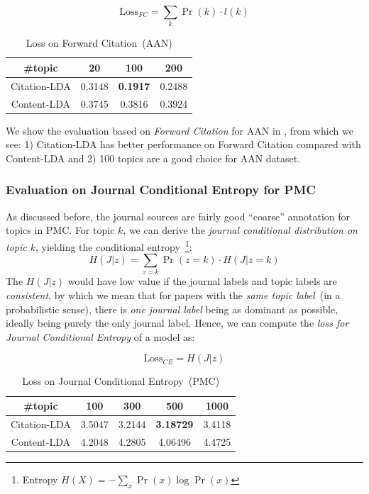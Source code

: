  $$\mathrm{Loss}_{FC} = \sum\limits_k \Pr(k) \cdot l(k)$$

\begin{table}[h!]
\caption{Loss on Forward Citation~(AAN)}
\label{tab::citation-fc}
\begin{center}
\begin{tabular}{|c|c|c|c|}
\hline
\#topic	&	20	&	100	&	200 \\
\hline\hline
Citation-LDA 	& 0.3148		&	\textbf{0.1917}	&	0.2488	\\
Content-LDA		& 0.3745		&	0.3816	&	0.3924	\\
\hline \hline
\end{tabular}
\end{center}
\end{table}

We show the evaluation based on \emph{Forward Citation} for AAN in
, from which we see: 1) Citation-LDA has better
performance on Forward Citation compared with Content-LDA and 2) 100 topics are
a good choice for AAN dataset.

\subsubsection{Evaluation on Journal Conditional Entropy for PMC}

As discussed before, the journal sources are fairly good ``coarse'' annotation
for topics in PMC. For topic $k$, we can derive the \emph{journal conditional
  distribution on topic $k$}, yielding the conditional entropy~\footnote{Entropy
$H(X) = - \sum\limits_{x} \Pr(x) \log \Pr(x)$}:  $$H(J | z) =
\sum\limits_{z=k} \Pr(z=k) \cdot H(J | z=k)$$ The $H(J | z)$ would have low
value if the journal labels and topic labels are \emph{consistent}, by which
we mean that for papers with the \emph{same topic label}~(in a probabilistic
sense), there is \emph{one journal label} being as dominant as possible,
ideally being purely the only journal label. Hence, we can compute the
\emph{loss for Journal Conditional Entropy} of a model as:

$$\mathrm{Loss}_{CE} = H(J|z)$$

\begin{table}[h!]
\caption{Loss on Journal Conditional Entropy~(PMC)}
\label{tab::citation-ce}
\begin{center}
\begin{tabular}{|c|c|c|c|c|}
\hline
\#topic	&	100	& 300 &	500	&	1000 \\
\hline\hline
Citation-LDA 	& 	3.5047	&	3.2144	&	\textbf{3.18729}	&	3.4118\\
Content-LDA		& 	4.2048	& 	4.2805	&	4.06496	&	4.4725\\
\hline \hline
\end{tabular}
\end{center}
\end{table}

